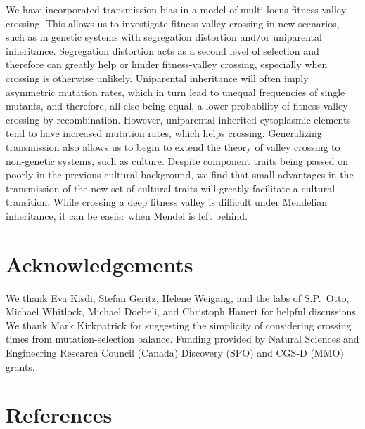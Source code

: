 \documentclass[review,3p,authoryear]{elsarticle}
\begin{document}
We have incorporated transmission bias in a model of multi-locus fitness-valley crossing.
This allows us to investigate fitness-valley crossing in new scenarios, such as in genetic systems with segregation distortion  and/or uniparental inheritance.
Segregation distortion acts as a second level of selection and therefore can greatly help or hinder fitness-valley crossing, especially when crossing is otherwise unlikely.
Uniparental inheritance will often imply asymmetric mutation rates, which in turn lead to unequal frequencies of single mutants, and therefore, all else being equal, a lower probability of fitness-valley crossing by recombination.
However, uniparental-inherited cytoplasmic elements tend to have increased mutation rates, which helps crossing.
Generalizing transmission also allows us to begin to extend the theory of valley crossing to non-genetic systems, such as culture. 
Despite component traits being passed on poorly in the previous cultural background, we find that small advantages in the transmission of the new set of cultural traits will greatly facilitate a cultural transition.
While crossing a deep fitness valley is difficult under Mendelian inheritance, it can be easier when Mendel is left behind.

\section{Acknowledgements}

We thank Eva Kisdi, Stefan Geritz, Helene Weigang, and the labs of S.P.\ Otto, Michael Whitlock, Michael Doebeli, and Christoph Hauert for helpful discussions.
We thank Mark Kirkpatrick for suggesting the simplicity of considering crossing times from mutation-selection balance.
Funding provided by Natural Sciences and Engineering Research Council (Canada) Discovery (SPO) and CGS-D (MMO) grants.

\doublespacing
\section{References}

\end{document}

